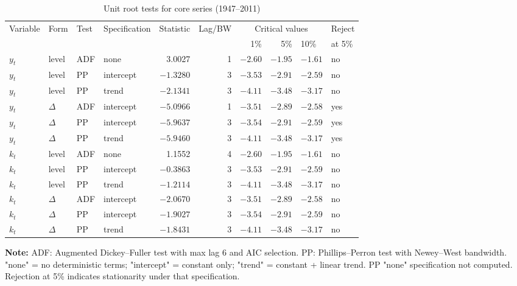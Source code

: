\begin{longtable}[t]{llllrrrrll}
\caption{Unit root tests for core series (1947--2011)}\label{tab:app_unit_roots}\\
\toprule
Variable & Form & Test & Specification & Statistic & Lag/BW & \multicolumn{3}{c}{Critical values} & Reject \\
\cmidrule(lr){7-9}
& & & & & & 1\% & 5\% & 10\% & at 5\% \\
\midrule
$y_t$ & level & ADF & none & 3.0027 & 1 & $-2.60$ & $-1.95$ & $-1.61$ & no \\
$y_t$ & level & PP & intercept & $-1.3280$ & 3 & $-3.53$ & $-2.91$ & $-2.59$ & no \\
$y_t$ & level & PP & trend & $-2.1341$ & 3 & $-4.11$ & $-3.48$ & $-3.17$ & no \\
$y_t$ & $\Delta$ & ADF & intercept & $-5.0966$ & 1 & $-3.51$ & $-2.89$ & $-2.58$ & yes \\
$y_t$ & $\Delta$ & PP & intercept & $-5.9637$ & 3 & $-3.54$ & $-2.91$ & $-2.59$ & yes \\
$y_t$ & $\Delta$ & PP & trend & $-5.9460$ & 3 & $-4.11$ & $-3.48$ & $-3.17$ & yes \\
\addlinespace
$k_t$ & level & ADF & none & 1.1552 & 4 & $-2.60$ & $-1.95$ & $-1.61$ & no \\
$k_t$ & level & PP & intercept & $-0.3863$ & 3 & $-3.53$ & $-2.91$ & $-2.59$ & no \\
$k_t$ & level & PP & trend & $-1.2114$ & 3 & $-4.11$ & $-3.48$ & $-3.17$ & no \\
$k_t$ & $\Delta$ & ADF & intercept & $-2.0670$ & 3 & $-3.51$ & $-2.89$ & $-2.58$ & no \\
$k_t$ & $\Delta$ & PP & intercept & $-1.9027$ & 3 & $-3.54$ & $-2.91$ & $-2.59$ & no \\
$k_t$ & $\Delta$ & PP & trend & $-1.8431$ & 3 & $-4.11$ & $-3.48$ & $-3.17$ & no \\
\bottomrule
\end{longtable}
\noindent\footnotesize\textbf{Note:} ADF: Augmented Dickey--Fuller test with max lag 6 and AIC selection. PP: Phillips--Perron test with Newey--West bandwidth. "none" = no deterministic terms; "intercept" = constant only; "trend" = constant + linear trend. PP "none" specification not computed. Rejection at 5\% indicates stationarity under that specification.